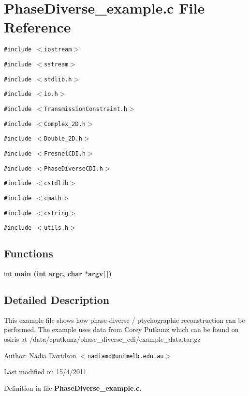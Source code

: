 \section{Phase\-Diverse\_\-example.c File Reference}
\label{PhaseDiverse__example_8c}
{\tt \#include $<$iostream$>$}\par
{\tt \#include $<$sstream$>$}\par
{\tt \#include $<$stdlib.h$>$}\par
{\tt \#include $<$io.h$>$}\par
{\tt \#include $<$Transmission\-Constraint.h$>$}\par
{\tt \#include $<$Complex\_\-2D.h$>$}\par
{\tt \#include $<$Double\_\-2D.h$>$}\par
{\tt \#include $<$Fresnel\-CDI.h$>$}\par
{\tt \#include $<$Phase\-Diverse\-CDI.h$>$}\par
{\tt \#include $<$cstdlib$>$}\par
{\tt \#include $<$cmath$>$}\par
{\tt \#include $<$cstring$>$}\par
{\tt \#include $<$utils.h$>$}\par
\subsection*{Functions}
\begin{CompactItemize}
\item 
int \bf{main} (int argc, char $\ast$argv[$\,$])\label{PhaseDiverse__example_8c_28052c36c3b61c6c0eaa18f5d226118f}

\end{CompactItemize}


\subsection{Detailed Description}
This example file shows how phase-diverse / ptychographic reconstruction can be performed. The example uses data from Corey Putkunz which can be found on osiris at /data/cputkunz/phase\_\-diverse\_\-cdi/example\_\-data.tar.gz

\begin{Desc}
\item[Author:]Nadia Davidson $<$\tt{nadiamd@unimelb.edu.au}$>$\end{Desc}
Last modified on 15/4/2011 

Definition in file \bf{Phase\-Diverse\_\-example.c}.